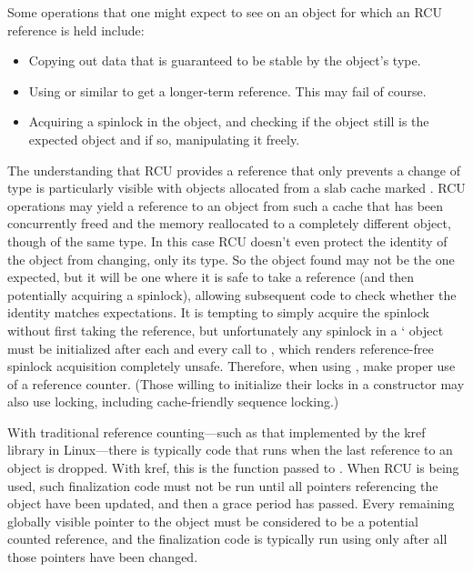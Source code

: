 Some operations that one might expect to see on an object for
which an RCU reference is held include:

\begin{itemize}
\item Copying out data that is guaranteed to be stable by the object's type.
\item Using  or similar to get a longer-term
      reference.
      This may fail of course.
\item Acquiring a spinlock in the object, and checking if the object still
      is the expected object and if so, manipulating it freely.
\end{itemize}

The understanding that RCU provides a reference that only prevents a
change of type is particularly visible with objects allocated from a
slab cache marked .
RCU operations may yield a
reference to an object from such a cache that has been concurrently freed
and the memory reallocated to a completely different object, though of
the same type.
In this case RCU doesn't even protect the identity of the
object from changing, only its type.
So the object found may not be the
one expected, but it will be one where it is safe to take a reference
(and then potentially acquiring a spinlock), allowing subsequent code
to check whether the identity matches expectations.
It is tempting
to simply acquire the spinlock without first taking the reference, but
unfortunately any spinlock in a ` object must be
initialized after each and every call to , which renders
reference-free spinlock acquisition completely unsafe.
Therefore, when
using , make proper use of a reference counter.
(Those willing to initialize their locks in a  constructor
may also use locking, including cache-friendly sequence locking.)

With traditional reference counting---such as that implemented by the
kref library in Linux---there is typically code that runs when the last
reference to an object is dropped.
With kref, this is the function
passed to .
When RCU is being used, such finalization code
must not be run until all  pointers referencing the object have
been updated, and then a grace period has passed.
Every remaining
globally visible pointer to the object must be considered to be a
potential counted reference, and the finalization code is typically run
using  only after all those pointers have been changed.


